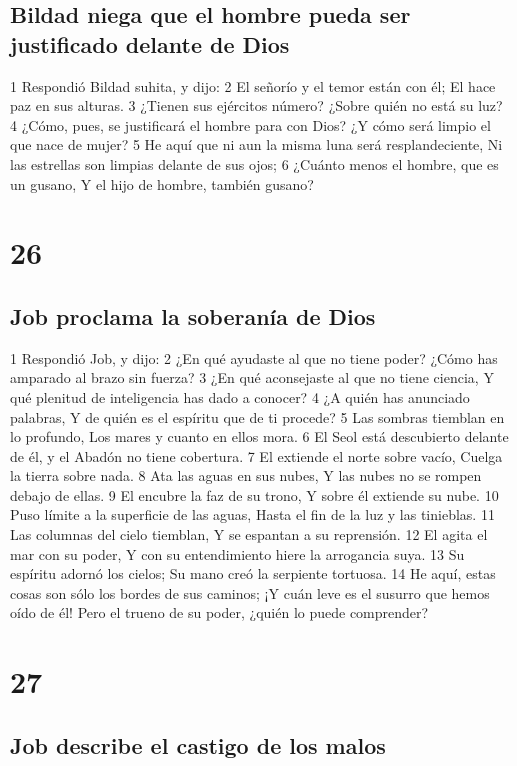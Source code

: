 \section*{Bildad niega que el hombre pueda ser justificado delante de Dios}

1 Respondió Bildad suhita, y dijo:
2 El señorío y el temor están con él;
El hace paz en sus alturas.
3 ¿Tienen sus ejércitos número?
¿Sobre quién no está su luz?
4 ¿Cómo, pues, se justificará el hombre para con Dios?
¿Y cómo será limpio el que nace de mujer?
5 He aquí que ni aun la misma luna será resplandeciente,
Ni las estrellas son limpias delante de sus ojos; 
6 ¿Cuánto menos el hombre, que es un gusano,
Y el hijo de hombre, también gusano?

\chapter{26}

\section*{Job proclama la soberanía de Dios}

1 Respondió Job, y dijo:
2 ¿En qué ayudaste al que no tiene poder?
¿Cómo has amparado al brazo sin fuerza?
3 ¿En qué aconsejaste al que no tiene ciencia,
Y qué plenitud de inteligencia has dado a conocer?
4 ¿A quién has anunciado palabras,
Y de quién es el espíritu que de ti procede?
5 Las sombras tiemblan en lo profundo,
Los mares y cuanto en ellos mora.
6 El Seol está descubierto delante de él, y el Abadón no tiene cobertura.
7 El extiende el norte sobre vacío,
Cuelga la tierra sobre nada.
8 Ata las aguas en sus nubes,
Y las nubes no se rompen debajo de ellas.
9 El encubre la faz de su trono,
Y sobre él extiende su nube.
10 Puso límite a la superficie de las aguas,
Hasta el fin de la luz y las tinieblas.
11 Las columnas del cielo tiemblan,
Y se espantan a su reprensión.
12 El agita el mar con su poder,
Y con su entendimiento hiere la arrogancia suya.
13 Su espíritu adornó los cielos;
Su mano creó la serpiente tortuosa.
14 He aquí, estas cosas son sólo los bordes de sus caminos;
¡Y cuán leve es el susurro que hemos oído de él!
Pero el trueno de su poder, ¿quién lo puede comprender?

\chapter{27}

\section*{Job describe el castigo de los malos}

